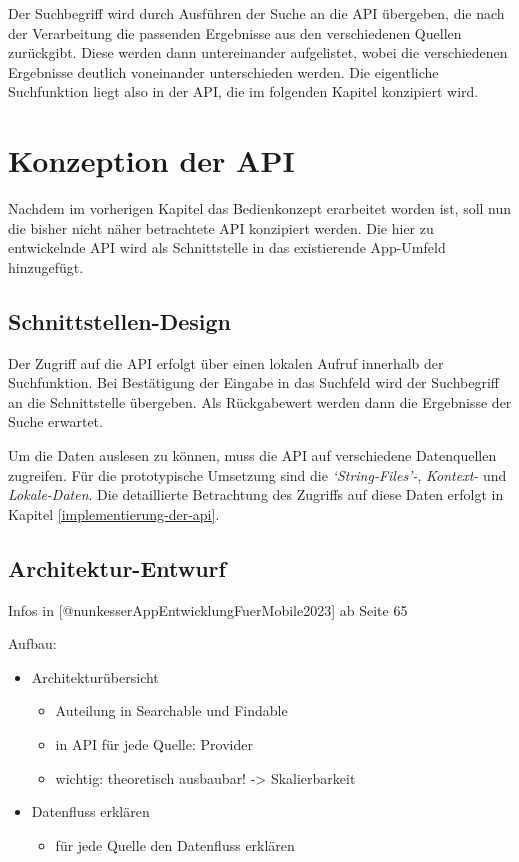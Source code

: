 \documentclass[
  12pt,
  a4paperpaper,
]{report}
\providecommand{\tightlist}{%
  \setlength{\itemsep}{0pt}\setlength{\parskip}{0pt}}
\begin{document}
Der Suchbegriff wird durch Ausführen der Suche an die API übergeben, die
nach der Verarbeitung die passenden Ergebnisse aus den verschiedenen
Quellen zurückgibt. Diese werden dann untereinander aufgelistet, wobei
die verschiedenen Ergebnisse deutlich voneinander unterschieden werden.
Die eigentliche Suchfunktion liegt also in der API, die im folgenden
Kapitel konzipiert wird.

\section{Konzeption der API}\label{konzeption-der-api}

Nachdem im vorherigen Kapitel das Bedienkonzept erarbeitet worden ist,
soll nun die bisher nicht näher betrachtete API konzipiert werden. Die
hier zu entwickelnde API wird als Schnittstelle in das existierende
App-Umfeld hinzugefügt.

\subsection{Schnittstellen-Design}\label{schnittstellen-design}

Der Zugriff auf die API erfolgt über einen lokalen Aufruf innerhalb der
Suchfunktion. Bei Bestätigung der Eingabe in das Suchfeld wird der
Suchbegriff an die Schnittstelle übergeben. Als Rückgabewert werden dann
die Ergebnisse der Suche erwartet.

Um die Daten auslesen zu können, muss die API auf verschiedene
Datenquellen zugreifen. Für die prototypische Umsetzung sind die
\emph{`String-Files'-}, \emph{Kontext-} und \emph{Lokale-Daten}. Die
detaillierte Betrachtung des Zugriffs auf diese Daten erfolgt in Kapitel
\ref{implementierung-der-api}.

\subsection{Architektur-Entwurf}\label{architektur-entwurf}

Infos in {[}@nunkesserAppEntwicklungFuerMobile2023{]} ab Seite 65

Aufbau:

\begin{itemize}
\tightlist
\item
  Architekturübersicht

  \begin{itemize}
  \tightlist
  \item
    Auteilung in Searchable und Findable
  \item
    in API für jede Quelle: Provider
  \item
    wichtig: theoretisch ausbaubar! -\textgreater{} Skalierbarkeit
  \end{itemize}
\item
  Datenfluss erklären

  \begin{itemize}
  \tightlist
  \item
    für jede Quelle den Datenfluss erklären
  \end{itemize}
\end{itemize}
\end{document}

